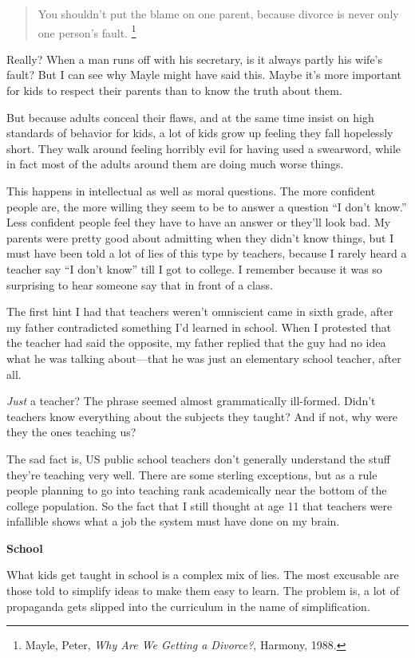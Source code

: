 \documentclass[12pt]{book}
\begin{document}
\begin{quote}
You shouldn't put the blame on one parent, because divorce is never only
one person's fault. \footnote{Mayle, Peter, \emph{Why Are We Getting a Divorce?}, Harmony,
1988.}
\end{quote}

Really? When a man runs off with his secretary, is it always partly his
wife's fault? But I can see why Mayle might have said this. Maybe it's
more important for kids to respect their parents than to know the truth
about them.

But because adults conceal their flaws, and at the same time insist on
high standards of behavior for kids, a lot of kids grow up feeling they
fall hopelessly short. They walk around feeling horribly evil for having
used a swearword, while in fact most of the adults around them are doing
much worse things.

This happens in intellectual as well as moral questions. The more
confident people are, the more willing they seem to be to answer a
question ``I don't know.'' Less confident people feel they have to have
an answer or they'll look bad. My parents were pretty good about
admitting when they didn't know things, but I must have been told a lot
of lies of this type by teachers, because I rarely heard a teacher say
``I don't know'' till I got to college. I remember because it was so
surprising to hear someone say that in front of a class.

The first hint I had that teachers weren't omniscient came in sixth
grade, after my father contradicted something I'd learned in school.
When I protested that the teacher had said the opposite, my father
replied that the guy had no idea what he was talking about---that he was
just an elementary school teacher, after all.

\emph{Just} a teacher? The phrase seemed almost grammatically
ill-formed. Didn't teachers know everything about the subjects they
taught? And if not, why were they the ones teaching us?

The sad fact is, US public school teachers don't generally understand
the stuff they're teaching very well. There are some sterling
exceptions, but as a rule people planning to go into teaching rank
academically near the bottom of the college population. So the fact that
I still thought at age 11 that teachers were infallible shows what a job
the system must have done on my brain.

\textbf{School}

What kids get taught in school is a complex mix of lies. The most
excusable are those told to simplify ideas to make them easy to learn.
The problem is, a lot of propaganda gets slipped into the curriculum in
the name of simplification.
\end{document}
